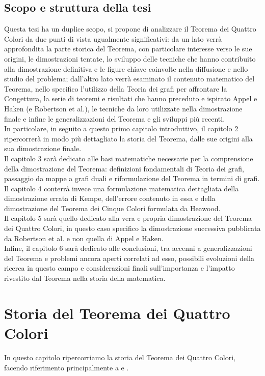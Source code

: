 \documentclass[a4paper,12pt,titlepage]{report}
\begin{document}
	\section{Scopo e struttura della tesi}
	Questa tesi ha un duplice scopo, si propone di analizzare il Teorema dei Quattro Colori da due punti di vista ugualmente significativi: da un lato verrà approfondita la parte storica del Teorema, con particolare interesse verso le sue origini, le dimostrazioni tentate, lo sviluppo delle tecniche che hanno contribuito alla dimostrazione definitiva e le figure chiave coinvolte nella diffusione e nello studio del problema; dall’altro lato verrà esaminato il contenuto matematico del Teorema, nello specifico l’utilizzo della Teoria dei grafi per affrontare la Congettura, la serie di teoremi e risultati che hanno preceduto e ispirato Appel e Haken (e Robertson et al.), le tecniche da loro utilizzate nella dimostrazione finale e infine le generalizzazioni del Teorema e gli sviluppi più recenti.
	\\In particolare, in seguito a questo primo capitolo introduttivo, il capitolo 2 ripercorrerà in modo più dettagliato la storia del Teorema, dalle sue origini alla sua dimostrazione finale.
	\\Il capitolo 3 sarà dedicato alle basi matematiche necessarie per la comprensione della dimostrazione del Teorema: definizioni fondamentali di Teoria dei grafi, passaggio da mappe a grafi duali e riformulazione del Teorema in termini di grafi.
	\\Il capitolo 4 conterrà invece una formulazione matematica dettagliata della dimostrazione errata di Kempe, dell'errore contenuto in essa e della dimostrazione del Teorema dei Cinque Colori formulata da Heawood.
	\\Il capitolo 5 sarà quello dedicato alla vera e propria dimostrazione del Teorema dei Quattro Colori, in questo caso specifico la dimostrazione successiva pubblicata da Robertson et al. e non quella di Appel e Haken.
	\\Infine, il capitolo 6 sarà dedicato alle conclusioni, tra accenni a generalizzazioni del Teorema e problemi ancora aperti correlati ad esso, possibili evoluzioni della ricerca in questo campo e considerazioni finali sull’importanza e l’impatto rivestito dal Teorema nella storia della matematica.
	
	\chapter[Storia del Teorema]{Storia del Teorema dei Quattro Colori}
	In questo capitolo ripercorriamo la storia del Teorema dei Quattro Colori, facendo riferimento principalmente a {\bfseries \cite{Saaty}} e {\bfseries \cite{Turner}}.
\end{document}
